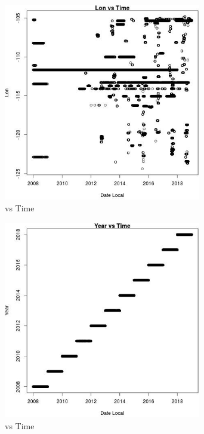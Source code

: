\begin{figure} 
\centering  
\includegraphics[width=0.77\textwidth]{Code_Outputs/Report_PM25_Step4_part_e_de_duplicated_aves_ML_input_LonvDate_Local.jpg} 
\caption{\label{fig:Report_PM25_Step4_part_e_de_duplicated_aves_ML_inputLonvDate_Local}vs Time} 
\end{figure} 
 

\begin{figure} 
\centering  
\includegraphics[width=0.77\textwidth]{Code_Outputs/Report_PM25_Step4_part_e_de_duplicated_aves_ML_input_YearvDate_Local.jpg} 
\caption{\label{fig:Report_PM25_Step4_part_e_de_duplicated_aves_ML_inputYearvDate_Local}vs Time} 
\end{figure} 
 

